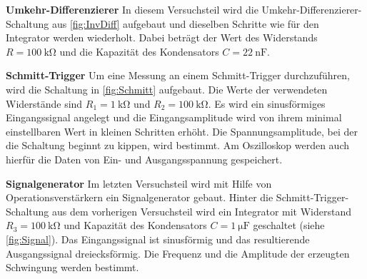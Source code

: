 \textbf{Umkehr-Differenzierer} \newline
In diesem Versuchsteil wird die Umkehr-Differenzierer-Schaltung aus \autoref{fig:InvDiff} aufgebaut und dieselben Schritte wie für den Integrator werden wiederholt. Dabei beträgt der Wert des Widerstands $R = \SI{100}{\kilo\ohm}$ und die Kapazität des Kondensators $C = \SI{22}{\nano\farad}$.



\textbf{Schmitt-Trigger} \newline
Um eine Messung an einem Schmitt-Trigger durchzuführen, wird die Schaltung in \autoref{fig:Schmitt} aufgebaut.
Die Werte der verwendeten Widerstände sind $R_1 = \SI{1}{\kilo\ohm}$ und $R_2 = \SI{100}{\kilo\ohm}$.
Es wird ein sinusförmiges Eingangssignal angelegt und die Eingangsamplitude wird von ihrem minimal einstellbaren Wert in kleinen Schritten erhöht.
Die Spannungsamplitude, bei der die Schaltung beginnt zu kippen, wird bestimmt.
Am Oszilloskop werden auch hierfür die Daten von Ein- und Ausgangsspannung gespeichert.



\textbf{Signalgenerator} \newline
Im letzten Versuchsteil wird mit Hilfe von Operationsverstärkern ein Signalgenerator gebaut.
Hinter die Schmitt-Trigger-Schaltung aus dem vorherigen Versuchsteil wird ein Integrator mit Widerstand $R_3 = \SI{100}{\kilo\ohm}$ und Kapazität des Kondensators $C = \SI{1}{\micro\farad}$ geschaltet (siehe \autoref{fig:Signal}). Das Eingangssignal ist sinusförmig und das resultierende Ausgangssignal dreiecksförmig. Die Frequenz und die Amplitude der erzeugten Schwingung werden bestimmt.




